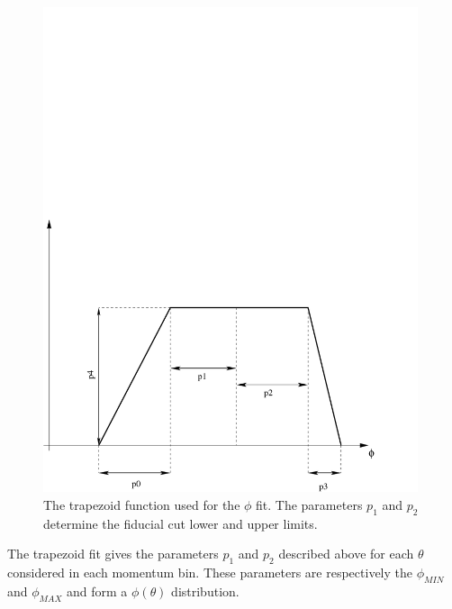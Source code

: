\begin{figure}[h]
 \begin{center}
 \includegraphics[width = 11cm, bb=-40 20 580 440]{data_reduction/img/traped}  
  \caption[The trapezoid function used for the $\phi$ fit]
          { The trapezoid function used for the $\phi$ fit. The parameters $p_1$ and $p_2$ determine
                     the fiducial cut lower and upper limits.  }
 \label{fig:traped}
 \end{center}
\end{figure}
The trapezoid fit gives the parameters $p_1$ and $p_2$ described above for each $\theta$ considered
in each momentum bin.
These parameters are respectively the $\phi_{MIN}$ and $\phi_{MAX}$ and 
form a $\phi(\theta)$ distribution.



